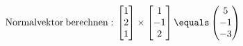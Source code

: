 \documentclass[preview]{standalone}
\begin{document}
\begin{center}
$\mathrm{Normalvektor \: berechnen: } \:\begin{bmatrix} 1 \\ 2 \\ 1 \end{bmatrix} \times \begin{bmatrix} 1 \\ -1 \\ 2 \end{bmatrix} \equals \begin{pmatrix} 5 \\ -1 \\ -3 \end{pmatrix}$
\end{center}
\end{document}
